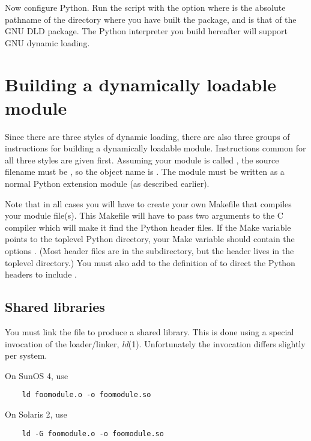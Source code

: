 Now configure Python.  Run the  script with the option
 where
 is the absolute pathname of the directory where you
have built the  package, and  is that
of the GNU DLD package.  The Python interpreter you build hereafter
will support GNU dynamic loading.


\section{Building a dynamically loadable module}

Since there are three styles of dynamic loading, there are also three
groups of instructions for building a dynamically loadable module.
Instructions common for all three styles are given first.  Assuming
your module is called , the source filename must be
, so the object name is .  The
module must be written as a normal Python extension module (as
described earlier).

Note that in all cases you will have to create your own Makefile that
compiles your module file(s).  This Makefile will have to pass two
 arguments to the C compiler which will make it find the
Python header files.  If the Make variable  points to
the toplevel Python directory, your  Make variable should
contain the options .
(Most header files are in the  subdirectory, but the
 header lives in the toplevel directory.)  You must
also add  to the definition of  to
direct the Python headers to include .


\subsection{Shared libraries}

You must link the  file to produce a shared library.  This is
done using a special invocation of the \UNIX{} loader/linker, {\em
ld}(1).  Unfortunately the invocation differs slightly per system.

On SunOS 4, use
\begin{verbatim}
    ld foomodule.o -o foomodule.so
\end{verbatim}

On Solaris 2, use
\begin{verbatim}
    ld -G foomodule.o -o foomodule.so
\end{verbatim}

